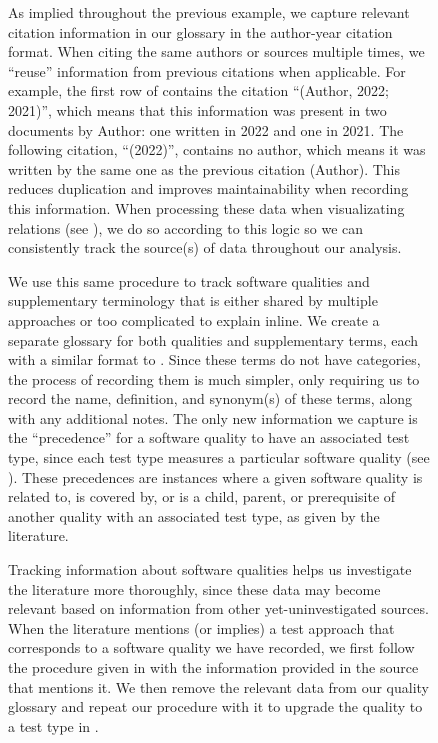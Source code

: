 \begin{figure}[h!]
\ifnotpaper
    \label{record-cites}
    As implied throughout the previous example, we capture relevant citation
    information in our glossary in the author-year citation format. When citing
    the same authors or sources multiple times, we ``reuse'' information from
    previous citations
    when applicable. For example, the first row of 
    contains the citation ``(Author, 2022; 2021)'', which means that this
    information was present in two documents by Author: one written in
    2022 and one in 2021. The following citation, ``(2022)'', contains no author,
    which means it was written by the same one as the previous citation (Author).
    This reduces duplication and improves maintainability when recording this
    information. When processing these data when visualizating relations
    (see ), we do so according to this
    logic  so we can
    consistently track the source(s) of data throughout our analysis.
\fi

\label{qual-supp-procedure}
We use this same procedure to track software qualities and supplementary
terminology that is either shared by multiple approaches or too complicated to
explain inline. We create a separate glossary for both qualities and
supplementary terms, each with a similar format to \ourApproachGlossary.
Since these terms do not have categories, the process of recording them is much
simpler, only requiring us to record the name, definition, and synonym(s) of
these terms, along with any additional notes. The only new information
we capture is the ``precedence'' for a software quality to have an associated
test type, since each test type measures a particular software quality (see
). These precedences are instances where a given software
quality is related to, is covered by, or is a child, parent, or prerequisite
of another quality with an associated test type, as given by the literature.

Tracking information about software qualities helps us investigate the
literature more thoroughly, since these data may become relevant based on
information from other yet-uninvestigated sources. When the literature mentions
(or implies) a test approach that corresponds to a software quality we have
recorded, we first follow the procedure given in 
with the information provided in the source that mentions it. We then remove
the relevant data from our quality glossary and repeat our procedure with it
to upgrade the quality to a test type in \ourApproachGlossary{}.


\end{figure}
